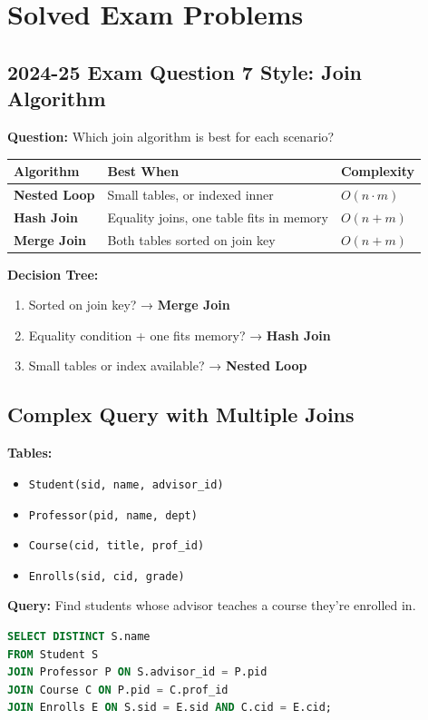 \section{Solved Exam Problems}

\subsection{2024-25 Exam Question 7 Style: Join Algorithm}

\begin{examplebox}
\textbf{Question:} Which join algorithm is best for each scenario?

\begin{center}
\begin{tabular}{lp{5cm}l}
\toprule
\textbf{Algorithm} & \textbf{Best When} & \textbf{Complexity} \\
\midrule
\textbf{Nested Loop} & Small tables, or indexed inner & $O(n \cdot m)$ \\
\textbf{Hash Join} & Equality joins, one table fits in memory & $O(n + m)$ \\
\textbf{Merge Join} & Both tables sorted on join key & $O(n + m)$ \\
\bottomrule
\end{tabular}
\end{center}

\textbf{Decision Tree:}
\begin{enumerate}
    \item Sorted on join key? → \textbf{Merge Join}
    \item Equality condition + one fits memory? → \textbf{Hash Join}
    \item Small tables or index available? → \textbf{Nested Loop}
\end{enumerate}
\end{examplebox}

\subsection{Complex Query with Multiple Joins}

\begin{examplebox}
\textbf{Tables:}
\begin{itemize}
    \item \texttt{Student(sid, name, advisor\_id)}
    \item \texttt{Professor(pid, name, dept)}
    \item \texttt{Course(cid, title, prof\_id)}
    \item \texttt{Enrolls(sid, cid, grade)}
\end{itemize}

\textbf{Query:} Find students whose advisor teaches a course they're enrolled in.

\begin{lstlisting}[language=SQL]
SELECT DISTINCT S.name
FROM Student S
JOIN Professor P ON S.advisor_id = P.pid
JOIN Course C ON P.pid = C.prof_id
JOIN Enrolls E ON S.sid = E.sid AND C.cid = E.cid;
\end{lstlisting}
\end{examplebox}


